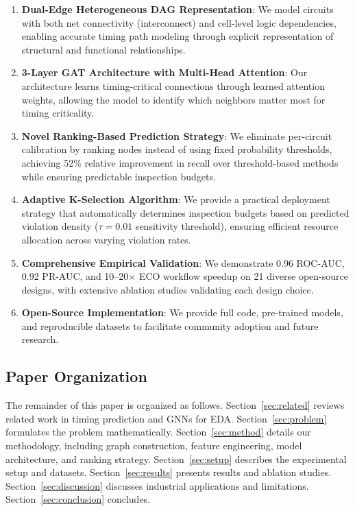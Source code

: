\documentclass[10pt,twocolumn,journal]{IEEEtran}
\begin{document}
\begin{enumerate}
    \item \textbf{Dual-Edge Heterogeneous DAG Representation}: We model circuits with both net connectivity (interconnect) and cell-level logic dependencies, enabling accurate timing path modeling through explicit representation of structural and functional relationships.
    
    \item \textbf{3-Layer GAT Architecture with Multi-Head Attention}: Our architecture learns timing-critical connections through learned attention weights, allowing the model to identify which neighbors matter most for timing criticality.
    
    \item \textbf{Novel Ranking-Based Prediction Strategy}: We eliminate per-circuit calibration by ranking nodes instead of using fixed probability thresholds, achieving 52\% relative improvement in recall over threshold-based methods while ensuring predictable inspection budgets.
    
    \item \textbf{Adaptive K-Selection Algorithm}: We provide a practical deployment strategy that automatically determines inspection budgets based on predicted violation density ($\tau=0.01$ sensitivity threshold), ensuring efficient resource allocation across varying violation rates.
    
    \item \textbf{Comprehensive Empirical Validation}: We demonstrate 0.96 ROC-AUC, 0.92 PR-AUC, and 10--20$\times$ ECO workflow speedup on 21 diverse open-source designs, with extensive ablation studies validating each design choice.
    
    \item \textbf{Open-Source Implementation}: We provide full code, pre-trained models, and reproducible datasets to facilitate community adoption and future research.
\end{enumerate}

\subsection{Paper Organization}

The remainder of this paper is organized as follows. Section~\ref{sec:related} reviews related work in timing prediction and GNNs for EDA. Section~\ref{sec:problem} formulates the problem mathematically. Section~\ref{sec:method} details our methodology, including graph construction, feature engineering, model architecture, and ranking strategy. Section~\ref{sec:setup} describes the experimental setup and datasets. Section~\ref{sec:results} presents results and ablation studies. Section~\ref{sec:discussion} discusses industrial applications and limitations. Section~\ref{sec:conclusion} concludes.
\end{document}
